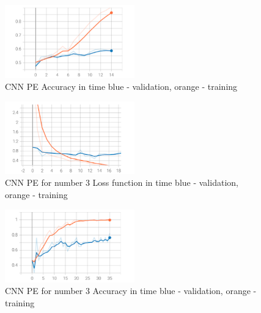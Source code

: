 \documentclass[conference]{IEEEtran}
\begin{document}
\begin{figure}[hbtp]
    \centerline{\includegraphics[width=0.5\textwidth]{Figures/Fig_CNN_PE_acc.png}}
    \caption{CNN PE Accuracy in time \textbar \; blue - validation, orange - training}
    \label{CNNPEAcc} %
    \end{figure}


\begin{figure}[hbtp]
    \centerline{\includegraphics[width=0.5\textwidth]{Figures/Fig_CNN_a3_loss.png}}
    \caption{CNN PE for number 3 Loss function in time \textbar \; blue - validation, orange - training}
    \label{CNNPE3Loss} %
    \end{figure}

\begin{figure}[hbtp]
    \centerline{\includegraphics[width=0.5\textwidth]{Figures/Fig_CNN_a3_acc.png}}
    \caption{CNN PE for number 3 Accuracy in time \textbar \; blue - validation, orange - training}
    \label{CNNPE3Acc} %
    \end{figure}
\end{document}
